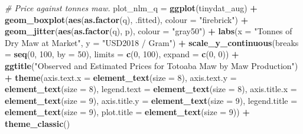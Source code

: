 \documentclass[]{article}
\newenvironment{Shaded}{\begin{snugshade}}{\end{snugshade}}
\newcommand{\KeywordTok}[1]{\textcolor[rgb]{0.13,0.29,0.53}{\textbf{#1}}}
\newcommand{\DataTypeTok}[1]{\textcolor[rgb]{0.13,0.29,0.53}{#1}}
\newcommand{\DecValTok}[1]{\textcolor[rgb]{0.00,0.00,0.81}{#1}}
\newcommand{\StringTok}[1]{\textcolor[rgb]{0.31,0.60,0.02}{#1}}
\newcommand{\CommentTok}[1]{\textcolor[rgb]{0.56,0.35,0.01}{\textit{#1}}}
\newcommand{\OperatorTok}[1]{\textcolor[rgb]{0.81,0.36,0.00}{\textbf{#1}}}
\newcommand{\NormalTok}[1]{#1}
\begin{document}
\begin{Shaded}
\begin{Highlighting}[]
\CommentTok{# Price against tonnes maw.}
\NormalTok{plot_nlm_q =}\StringTok{ }
\StringTok{  }\KeywordTok{ggplot}\NormalTok{(tinydat_aug) }\OperatorTok{+}
\StringTok{  }\KeywordTok{geom_boxplot}\NormalTok{(}\KeywordTok{aes}\NormalTok{(}\KeywordTok{as.factor}\NormalTok{(q), .fitted), }\DataTypeTok{colour =} \StringTok{"firebrick"}\NormalTok{) }\OperatorTok{+}
\StringTok{  }\KeywordTok{geom_jitter}\NormalTok{(}\KeywordTok{aes}\NormalTok{(}\KeywordTok{as.factor}\NormalTok{(q), p), }\DataTypeTok{colour =} \StringTok{"gray50"}\NormalTok{) }\OperatorTok{+}
\StringTok{  }\KeywordTok{labs}\NormalTok{(}\DataTypeTok{x =} \StringTok{"Tonnes of Dry Maw at Market"}\NormalTok{, }\DataTypeTok{y =} \StringTok{"USD2018 / Gram"}\NormalTok{) }\OperatorTok{+}
\StringTok{  }\KeywordTok{scale_y_continuous}\NormalTok{(}\DataTypeTok{breaks =} \KeywordTok{seq}\NormalTok{(}\DecValTok{0}\NormalTok{, }\DecValTok{100}\NormalTok{, }\DataTypeTok{by =} \DecValTok{50}\NormalTok{), }\DataTypeTok{limits =} \KeywordTok{c}\NormalTok{(}\DecValTok{0}\NormalTok{, }\DecValTok{100}\NormalTok{), }\DataTypeTok{expand =} \KeywordTok{c}\NormalTok{(}\DecValTok{0}\NormalTok{, }\DecValTok{0}\NormalTok{)) }\OperatorTok{+}
\StringTok{  }\KeywordTok{ggtitle}\NormalTok{(}\StringTok{"Observed and Estimated Prices for Totoaba Maw by Maw Production"}\NormalTok{) }\OperatorTok{+}
\StringTok{  }\KeywordTok{theme}\NormalTok{(}\DataTypeTok{axis.text.x =} \KeywordTok{element_text}\NormalTok{(}\DataTypeTok{size =} \DecValTok{8}\NormalTok{),}
        \DataTypeTok{axis.text.y =} \KeywordTok{element_text}\NormalTok{(}\DataTypeTok{size =} \DecValTok{8}\NormalTok{),}
        \DataTypeTok{legend.text =} \KeywordTok{element_text}\NormalTok{(}\DataTypeTok{size =} \DecValTok{8}\NormalTok{),}
        \DataTypeTok{axis.title.x =} \KeywordTok{element_text}\NormalTok{(}\DataTypeTok{size =} \DecValTok{9}\NormalTok{),}
        \DataTypeTok{axis.title.y =} \KeywordTok{element_text}\NormalTok{(}\DataTypeTok{size =} \DecValTok{9}\NormalTok{),}
        \DataTypeTok{legend.title =} \KeywordTok{element_text}\NormalTok{(}\DataTypeTok{size =} \DecValTok{9}\NormalTok{),}
        \DataTypeTok{plot.title =} \KeywordTok{element_text}\NormalTok{(}\DataTypeTok{size =} \DecValTok{9}\NormalTok{)) }\OperatorTok{+}
\StringTok{  }\KeywordTok{theme_classic}\NormalTok{()}


\end{Highlighting}
\end{Shaded}
\end{document}

